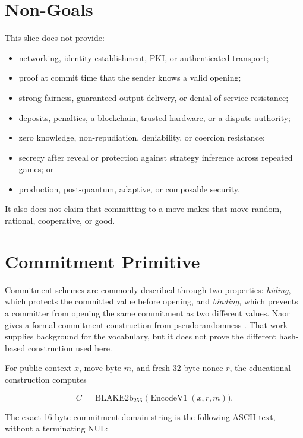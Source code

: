 \section{Non-Goals}

This slice does not provide:

\begin{itemize}
    \item networking, identity establishment, PKI, or authenticated transport;
    \item proof at commit time that the sender knows a valid opening;
    \item strong fairness, guaranteed output delivery, or denial-of-service
    resistance;
    \item deposits, penalties, a blockchain, trusted hardware, or a dispute
    authority;
    \item zero knowledge, non-repudiation, deniability, or coercion resistance;
    \item secrecy after reveal or protection against strategy inference across
    repeated games; or
    \item production, post-quantum, adaptive, or composable security.
\end{itemize}

It also does not claim that committing to a move makes that move random,
rational, cooperative, or good.

\section{Commitment Primitive}

Commitment schemes are commonly described through two properties:
\emph{hiding}, which protects the committed value before opening, and
\emph{binding}, which prevents a committer from opening the same commitment as
two different values. Naor gives a formal commitment construction from
pseudorandomness \cite{naor1991bitcommitment}. That work supplies background
for the vocabulary, but it does not prove the different hash-based construction
used here.

For public context \(x\), move byte \(m\), and fresh 32-byte nonce \(r\), the
educational construction computes

\[
    C=\operatorname{BLAKE2b}_{256}
      \bigl(\operatorname{EncodeV1}(x,r,m)\bigr).
\]

The exact 16-byte commitment-domain string is the following ASCII text, without
a terminating NUL:

